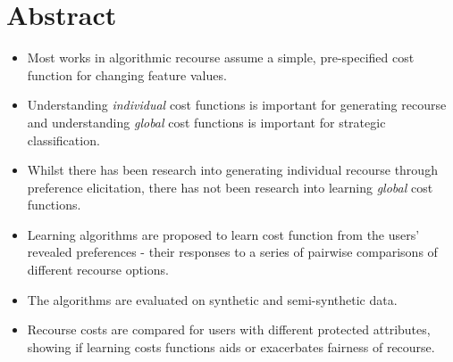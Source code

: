 \clearpage
{
    \pagestyle{abstract}
    \chapter*{Abstract}
    \begin{itemize}
    	\item Most works in algorithmic recourse assume a simple, pre-specified cost function for changing feature values.
    	\item Understanding \textit{individual} cost functions is important for generating recourse and understanding \textit{global} cost functions is important for strategic classification.
    	\item Whilst there has been research into generating individual recourse through preference elicitation, there has not been research into learning \textit{global} cost functions.
    	\item Learning algorithms are proposed to learn cost function from the users' revealed preferences - their responses to a series of pairwise comparisons of different recourse options.
    	\item The algorithms are evaluated on synthetic and semi-synthetic data.
    	\item Recourse costs are compared for users with different protected attributes, showing if learning costs functions aids or exacerbates fairness of recourse.
    \end{itemize}
    \thispagestyle{abstract}
}
\newpage



